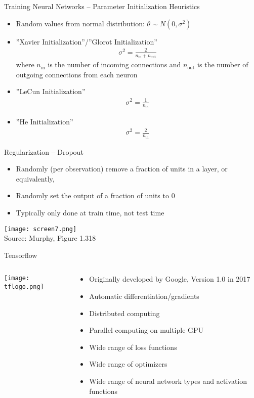 \documentclass[ignorenonframetext,xcolor=x11names]{beamer}
\begin{document}
\begin{frame}{Training Neural Networks -- Parameter Initialization Heuristics}
\begin{itemize}
  \item Random values from normal distribution: $\theta \sim N(0, \sigma^2)$
  \item ''Xavier Initialization''/''Glorot Initialization''
\begin{align*}
  \sigma^2 = \frac{2}{n_{\text{in}} + n_{\text{out}}}
\end{align*}
   where $n_{\text{in}}$ is the number of incoming connections and $n_{\text{out}}$ is the number of outgoing connections from each neuron
   \item ''LeCun Initialization''
\begin{align*}
  \sigma^2 = \frac{1}{n_{\text{in}}}
\end{align*}
   \item ''He Initialization''
\begin{align*}
  \sigma^2 = \frac{2}{n_{\text{in}}}
\end{align*}
\end{itemize}
\end{frame}


\begin{frame}{Regularization -- Dropout}
\begin{itemize}
   \item Randomly (per observation) remove a fraction of units in a layer, or equivalently,
   \item Randomly set the output of a fraction of units to 0
   \item Typically only done at train time, not test time
\end{itemize}
\centering
\texttt{[image: screen7.png]} \\

\scriptsize Source: Murphy, Figure 1.318
\end{frame}

\begin{frame}{Tensorflow}
\begin{columns}
\begin{column}{0.3\textwidth}
\texttt{[image: tflogo.png]}
\end{column}
\begin{column}{0.7\textwidth}
\begin{itemize}
  \item Originally developed by Google, Version 1.0 in 2017
  \item Automatic differentiation/gradients
  \item Distributed computing
  \item Parallel computing on multiple GPU
  \item Wide range of loss functions
  \item Wide range of optimizers
  \item Wide range of neural network types and activation functions
\end{itemize}
\end{column}
\end{columns}
\end{frame}
\end{document}
